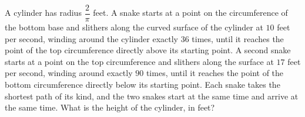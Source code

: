 A cylinder has radius $\dfrac{2}{\pi}$ feet. A snake starts at a point on the circumference of the bottom base and slithers along the curved surface of the cylinder at $10$ feet per second, winding around the cylinder exactly $36$ times, until it reaches the point of the top circumference directly above its starting point. A second snake starts at a point on the top circumference and slithers along the surface at $17$ feet per second, winding around exactly $90$ times, until it reaches the point of the bottom circumference directly below its starting point. Each snake takes the shortest path of its kind, and the two snakes start at the same time and arrive at the same time. What is the height of the cylinder, in feet?
